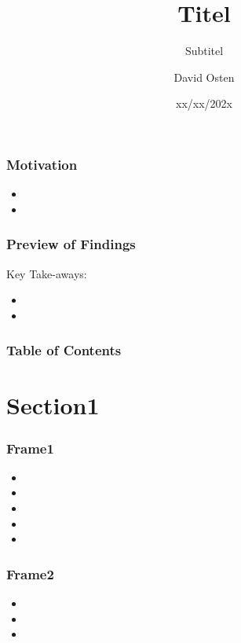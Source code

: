 \documentclass[xcolor={usenames,dvipsnames}, 
	hyperref={
	colorlinks=false, 						%
	linkcolor=black, 						%
	urlcolor=black,							%
	citecolor=black,						%
	pdfpagelabels=false,
	},
	ignorenonframetext,			%
	compress,					%
	aspectratio=169
]{beamer}
\title{Titel}
\subtitle[Optional Subtitle]{Subtitel}
\author{David Osten}
\institute{Topic/Lecture Series}
\date{xx/xx/202x}
\begin{document}
\begin{frame}  
	\titlepage
\end{frame}
	
\addtocounter{framenumber}{-1} %







\begin{frame}
	\frametitle{Motivation}
	\begin{itemize}
		\item 
		\item 
	\end{itemize}
\end{frame}

\begin{frame}
	\frametitle{Preview of Findings}
	Key Take-aways:
	\begin{itemize}
		\item 
		\item 
	\end{itemize}
\end{frame}

\begin{frame}
	\frametitle{Table of Contents}
	\tableofcontents
\end{frame}


\section{Section1}
\begin{frame}
	\frametitle{Frame1}
	\begin{itemize}
	\item 
	\item 
	\item
	\item 
	\item 
\end{itemize}

\end{frame}


\begin{frame}
\frametitle{Frame2}

\begin{itemize}
	\item 
	\item
	\item 
\end{itemize}

\end{frame}
\end{document}
